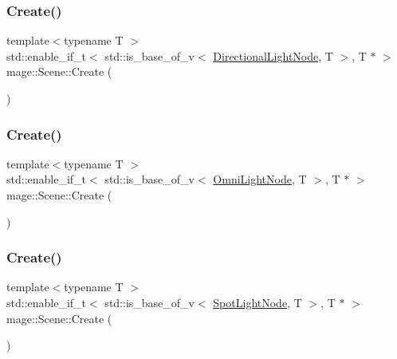 \hypertarget{classmage_1_1_scene_ac8ced3240230bfe50adb2dc35375e5c4}{}\label{classmage_1_1_scene_ac8ced3240230bfe50adb2dc35375e5c4} 
\subsubsection{\texorpdfstring{Create()}{Create()}\hspace{0.1cm}{\footnotesize\ttfamily [4/7]}}
{\footnotesize\ttfamily template$<$typename T $>$ \\
std\+::enable\+\_\+if\+\_\+t$<$ std\+::is\+\_\+base\+\_\+of\+\_\+v$<$ \hyperlink{namespacemage_a7637b5351fc0f66a10badd80ebb35899}{Directional\+Light\+Node}, T $>$, T $\ast$ $>$ mage\+::\+Scene\+::\+Create (\begin{DoxyParamCaption}{ }\end{DoxyParamCaption})}

\hypertarget{classmage_1_1_scene_ac4da9b8d066c7cc1d041a0ca19b9143b}{}\label{classmage_1_1_scene_ac4da9b8d066c7cc1d041a0ca19b9143b} 
\subsubsection{\texorpdfstring{Create()}{Create()}\hspace{0.1cm}{\footnotesize\ttfamily [5/7]}}
{\footnotesize\ttfamily template$<$typename T $>$ \\
std\+::enable\+\_\+if\+\_\+t$<$ std\+::is\+\_\+base\+\_\+of\+\_\+v$<$ \hyperlink{namespacemage_a1724c6e6b6b5ba535cdd967cbbb4a669}{Omni\+Light\+Node}, T $>$, T $\ast$ $>$ mage\+::\+Scene\+::\+Create (\begin{DoxyParamCaption}{ }\end{DoxyParamCaption})}

\hypertarget{classmage_1_1_scene_a4a9e8d8223de7d83d54087fc127508ae}{}\label{classmage_1_1_scene_a4a9e8d8223de7d83d54087fc127508ae} 
\subsubsection{\texorpdfstring{Create()}{Create()}\hspace{0.1cm}{\footnotesize\ttfamily [6/7]}}
{\footnotesize\ttfamily template$<$typename T $>$ \\
std\+::enable\+\_\+if\+\_\+t$<$ std\+::is\+\_\+base\+\_\+of\+\_\+v$<$ \hyperlink{namespacemage_aeed5dee4ff6c591eabb0e9114256df4a}{Spot\+Light\+Node}, T $>$, T $\ast$ $>$ mage\+::\+Scene\+::\+Create (\begin{DoxyParamCaption}{ }\end{DoxyParamCaption})}

